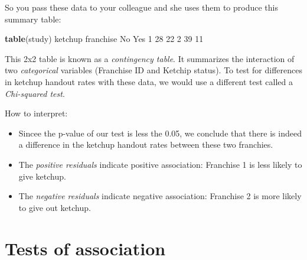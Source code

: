\documentclass[
]{book}
\newenvironment{Shaded}{\begin{snugshade}}{\end{snugshade}}
\newcommand{\CommentTok}[1]{\textcolor[rgb]{0.56,0.35,0.01}{\textit{#1}}}
\newcommand{\DecValTok}[1]{\textcolor[rgb]{0.00,0.00,0.81}{#1}}
\newcommand{\FloatTok}[1]{\textcolor[rgb]{0.00,0.00,0.81}{#1}}
\newcommand{\KeywordTok}[1]{\textcolor[rgb]{0.13,0.29,0.53}{\textbf{#1}}}
\newcommand{\NormalTok}[1]{#1}
\newcommand{\OperatorTok}[1]{\textcolor[rgb]{0.81,0.36,0.00}{\textbf{#1}}}
\newcommand{\StringTok}[1]{\textcolor[rgb]{0.31,0.60,0.02}{#1}}
\begin{document}
So you pass these data to your colleague and she uses them to produce this summary table:

\begin{Shaded}
\begin{Highlighting}[]
\KeywordTok{table}\NormalTok{(study)}
\NormalTok{         ketchup}
\NormalTok{franchise No Yes}
        \DecValTok{1} \DecValTok{28}  \DecValTok{22}
        \DecValTok{2} \DecValTok{39}  \DecValTok{11}
\end{Highlighting}
\end{Shaded}

This 2x2 table is known as a \emph{contingency table}. It summarizes the interaction of two \emph{categorical} variables (Franchise ID and Ketchip status). To test for differences in ketchup handout rates with these data, we would use a different test called a \emph{Chi-squared test}.

\begin{Shaded}
\end{Shaded}

How to interpret:

\begin{itemize}
\item
  Sincee the p-value of our test is less the 0.05, we conclude that there is indeed a difference in the ketchup handout rates between these two franchies.
\item
  The \emph{positive residuals} indicate positive association: Franchise 1 is less likely to give ketchup.
\item
  The \emph{negative residuals} indicate negative association: Franchise 2 is more likely to give out ketchup.
\end{itemize}

\hypertarget{tests-of-association}{%
\section*{Tests of association}\label{tests-of-association}}
\end{document}
